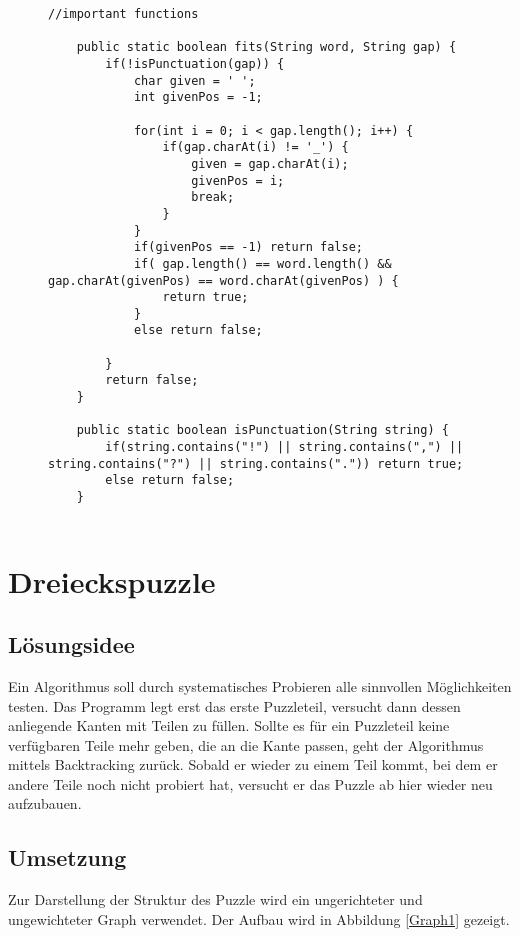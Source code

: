 \documentclass[a4paper, 12pt]{scrartcl}
\begin{document}
\begin{figure}[H]
\begin{lstlisting}
//important functions

    public static boolean fits(String word, String gap) {
    	if(!isPunctuation(gap)) {
	    	char given = ' ';
	    	int givenPos = -1;
	    	
	    	for(int i = 0; i < gap.length(); i++) {
	    		if(gap.charAt(i) != '_') {
	    			given = gap.charAt(i);
	    			givenPos = i;
	    			break;
	    		}
	    	}
	    	if(givenPos == -1) return false;
	    	if( gap.length() == word.length() && gap.charAt(givenPos) == word.charAt(givenPos) ) {
	    		return true;
	    	}
	    	else return false;
	    	
        }
    	return false;
    }

    public static boolean isPunctuation(String string) {
    	if(string.contains("!") || string.contains(",") || string.contains("?") || string.contains(".")) return true;
    	else return false;
    }
    
\end{lstlisting}
\end{figure}

\section{Dreieckspuzzle}
\subsection{Lösungsidee}

Ein Algorithmus soll durch systematisches Probieren alle sinnvollen Möglichkeiten testen. Das Programm legt erst das erste Puzzleteil, versucht dann dessen anliegende Kanten mit Teilen zu füllen. Sollte es für ein Puzzleteil keine verfügbaren Teile mehr geben, die an die Kante passen, geht der Algorithmus mittels Backtracking zurück. Sobald er wieder zu einem Teil kommt, bei dem er andere Teile noch nicht probiert hat, versucht er das Puzzle ab hier wieder neu aufzubauen.

\subsection{Umsetzung}

Zur Darstellung der Struktur des Puzzle wird ein ungerichteter und ungewichteter Graph verwendet. Der Aufbau wird in Abbildung \ref{Graph1} gezeigt.
\end{document}
